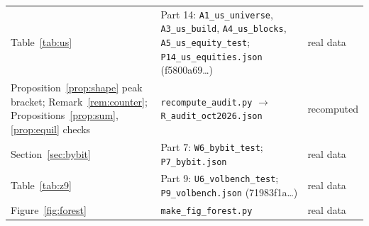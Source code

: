 \documentclass[12pt]{article}
\theoremstyle{definition}
\theoremstyle{remark}
\begin{document}
\begin{longtable}{p{}p{}p{}}
Table~\ref{tab:us} & Part 14: \texttt{A1\_us\_universe}, \texttt{A3\_us\_build}, \texttt{A4\_us\_blocks}, \texttt{A5\_us\_equity\_test}; \texttt{P14\_us\_equities.json} (f5800a69\ldots) & real data\\
Proposition~\ref{prop:shape} peak bracket; Remark~\ref{rem:counter}; Propositions~\ref{prop:sum}, \ref{prop:equil} checks & \texttt{recompute\_audit.py} $\to$ \texttt{R\_audit\_oct2026.json} & recomputed\\
Section~\ref{sec:bybit} & Part 7: \texttt{W6\_bybit\_test}; \texttt{P7\_bybit.json} & real data\\
Table~\ref{tab:z9} & Part 9: \texttt{U6\_volbench\_test}; \texttt{P9\_volbench.json} (71983f1a\ldots) & real data\\
Figure~\ref{fig:forest} & \texttt{make\_fig\_forest.py} & real data\\
\bottomrule
\end{longtable}
\end{document}
